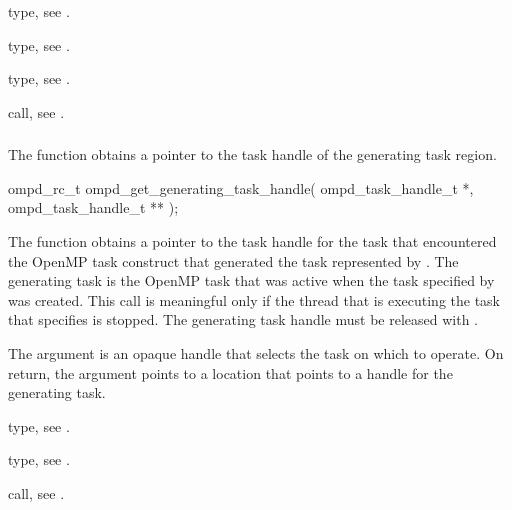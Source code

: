 \begin{crossrefs}
\item {} type, 
see .

\item {} type, see .

\item {} type, see .

\item {} call, 
see .
\end{crossrefs}



\subsubsection{}
\label{subsubsubsec:ompd_get_generating_task_handle}

\summary
The  function obtains a pointer 
to the task handle of the generating task region.

\format
\begin{cspecific}
\begin{ompSyntax}
ompd_rc_t ompd_get_generating_task_handle(
  ompd_task_handle_t *,
  ompd_task_handle_t **
);
\end{ompSyntax}
\end{cspecific}


\descr
The  function obtains a pointer to 
the task handle for the task that encountered the OpenMP task construct 
that generated the task represented by . The generating 
task is the OpenMP task that was active when the task specified by 
 was created. This call is meaningful only if the thread 
that is executing the task that  specifies is stopped. 
The generating task handle must be released with .

\argdesc
The  argument is an opaque handle that selects the task on
which to operate. On return, the  argument points
to a location that points to a handle for the generating task.

\begin{crossrefs}
\item {} type, see .

\item {} type, see .

\item {} call, 
see .
\end{crossrefs}




